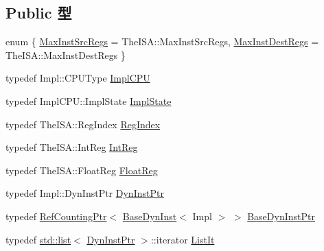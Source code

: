 \subsection*{Public 型}
\begin{DoxyCompactItemize}
\item 
enum \{ \hyperlink{classBaseDynInst_ae4d5251432e1a9e6803c0240cc492e18a17b78fe104e3bf28fca535a040514084}{MaxInstSrcRegs} =  TheISA::MaxInstSrcRegs, 
\hyperlink{classBaseDynInst_ae4d5251432e1a9e6803c0240cc492e18a6a2e9b17a83d01eb4ee6bbdd739be9eb}{MaxInstDestRegs} =  TheISA::MaxInstDestRegs
 \}
\item 
typedef Impl::CPUType \hyperlink{classBaseDynInst_a9792f311b2805cbefb8cb15c1c4a4cf5}{ImplCPU}
\item 
typedef ImplCPU::ImplState \hyperlink{classBaseDynInst_a767a9d57347239b1c904738bbd7796fa}{ImplState}
\item 
typedef TheISA::RegIndex \hyperlink{classBaseDynInst_a36d25e03e43fa3bb4c5482cbefe5e0fb}{RegIndex}
\item 
typedef TheISA::IntReg \hyperlink{classBaseDynInst_a1355cb78d031430d4d70eb5080267604}{IntReg}
\item 
typedef TheISA::FloatReg \hyperlink{classBaseDynInst_a75484259f1855aabc8d74c6eb1cfe186}{FloatReg}
\item 
typedef Impl::DynInstPtr \hyperlink{classBaseDynInst_a028ce10889c5f6450239d9e9a7347976}{DynInstPtr}
\item 
typedef \hyperlink{classRefCountingPtr}{RefCountingPtr}$<$ \hyperlink{classBaseDynInst}{BaseDynInst}$<$ Impl $>$ $>$ \hyperlink{classBaseDynInst_ab1bbb895c1fee69912972ee66ed93c18}{BaseDynInstPtr}
\item 
typedef \hyperlink{classstd_1_1list}{std::list}$<$ \hyperlink{classBaseDynInst_a028ce10889c5f6450239d9e9a7347976}{DynInstPtr} $>$::iterator \hyperlink{classBaseDynInst_a184cb829e22cc656acb41864f68f51ea}{ListIt}
\end{DoxyCompactItemize}
